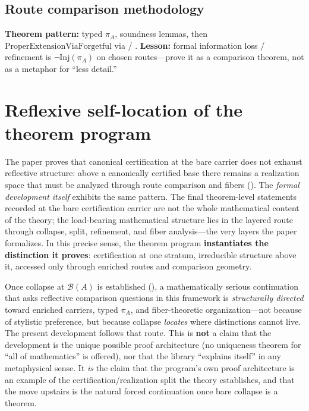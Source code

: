 \documentclass[11pt]{article}
\begin{document}
\subsection{Route comparison methodology}\label{sec:contributions-route}
\textbf{Theorem pattern:} typed $\pi_A$, soundness lemmas, then $\mathrm{ProperExtensionViaForgetful}$ via  / . \textbf{Lesson:} formal information loss / refinement is $\neg\mathrm{Inj}(\pi_A)$ on chosen routes---prove it as a comparison theorem, not as a metaphor for ``less detail.''

\section{Reflexive self-location of the theorem program}\label{sec:reflexive-location}

The paper proves that canonical certification at the bare carrier does not exhaust reflective structure: above a canonically certified base there remains a realization space that must be analyzed through route comparison and fibers (). The \emph{formal development itself} exhibits the same pattern. The final theorem-level statements recorded at the bare certification carrier are not the whole mathematical content of the theory; the load-bearing mathematical structure lies in the layered route through collapse, split, refinement, and fiber analysis---the very layers the paper formalizes. In this precise sense, the theorem program \textbf{instantiates the distinction it proves}: certification at one stratum, irreducible structure above it, accessed only through enriched routes and comparison geometry.

Once collapse at $\mathcal{B}(A)$ is established (), a mathematically serious continuation that asks reflective comparison questions in this framework is \emph{structurally directed} toward enriched carriers, typed $\pi_A$, and fiber-theoretic organization---not because of stylistic preference, but because collapse \emph{locates} where distinctions cannot live. The present development follows that route. This is \textbf{not} a claim that the development is the unique possible proof architecture (no uniqueness theorem for ``all of mathematics'' is offered), nor that the library ``explains itself'' in any metaphysical sense. It \emph{is} the claim that the program's own proof architecture is an example of the certification/realization split the theory establishes, and that the move upstairs is the natural forced continuation once bare collapse is a theorem.
\end{document}
